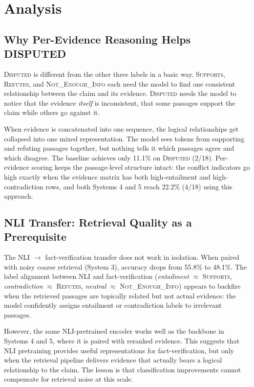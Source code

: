 \documentclass[11pt]{article}
\begin{document}
\section{Analysis}

\subsection{Why Per-Evidence Reasoning Helps DISPUTED}

\textsc{Disputed} is different from the other three labels in a basic
way.
\textsc{Supports}, \textsc{Refutes}, and \textsc{Not\_Enough\_Info}
each need the model to find one consistent relationship between the
claim and its evidence.
\textsc{Disputed} needs the model to notice that the evidence
\emph{itself} is inconsistent, that some passages support the claim
while others go against it.

When evidence is concatenated into one sequence, the logical
relationships get collapsed into one mixed representation.
The model sees tokens from supporting and refuting passages together,
but nothing tells it which passages agree and which disagree.
The baseline achieves only 11.1\% on \textsc{Disputed} (2/18).
Per-evidence scoring keeps the passage-level structure intact: the
conflict indicators go high exactly when the evidence matrix has both
high-entailment and high-contradiction rows, and both Systems 4 and 5
reach 22.2\% (4/18) using this approach.

\subsection{NLI Transfer: Retrieval Quality as a Prerequisite}

The NLI $\to$ fact-verification transfer does not work in isolation.
When paired with noisy coarse retrieval (System 3), accuracy drops
from 55.8\% to 48.1\%.
The label alignment between NLI and fact-verification
(\emph{entailment} $\approx$ \textsc{Supports},
\emph{contradiction} $\approx$ \textsc{Refutes},
\emph{neutral} $\approx$ \textsc{Not\_Enough\_Info})
appears to backfire when the retrieved passages are topically related
but not actual evidence: the model confidently assigns entailment or
contradiction labels to irrelevant passages.

However, the same NLI-pretrained encoder works well as the backbone
in Systems 4 and 5, where it is paired with reranked evidence.
This suggests that NLI pretraining provides useful representations
for fact-verification, but only when the retrieval pipeline delivers
evidence that actually bears a logical relationship to the claim.
The lesson is that classification improvements cannot compensate for
retrieval noise at this scale.
\end{document}
